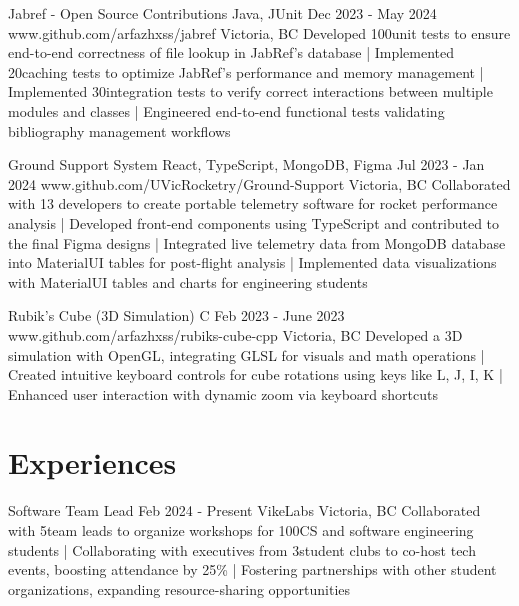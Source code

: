 \documentclass[a4paper,10pt]{article}
\begin{document}

\projectentry
{Jabref - Open Source Contributions}
{Java, JUnit}
{Dec 2023 - May 2024}
{www.github.com/arfazhxss/jabref}
{Victoria, BC}
{Developed 100\plus unit tests to ensure end-to-end correctness of file lookup in JabRef's database
| Implemented 20\plus caching tests to optimize JabRef's performance and memory management
| Implemented 30\plus integration tests to verify correct interactions between multiple modules and classes
| Engineered end-to-end functional tests validating bibliography management workflows
}

\projectentry
{Ground Support System}
{React, TypeScript, MongoDB, Figma}
{Jul 2023 - Jan 2024}
{www.github.com/UVicRocketry/Ground-Support}
{Victoria, BC}
{Collaborated with 13 developers to create portable telemetry software for rocket performance analysis 
| Developed front-end components using TypeScript and contributed to the final Figma designs
| Integrated live telemetry data from MongoDB database into MaterialUI tables for post-flight analysis
| Implemented data visualizations with MaterialUI tables and charts for engineering students 
}

\projectentry
{Rubik's Cube (3D Simulation)}
{C\plusplus}
{Feb 2023 - June 2023}
{www.github.com/arfazhxss/rubiks-cube-cpp}
{Victoria, BC}
{Developed a 3D simulation with OpenGL, integrating GLSL for visuals and math operations 
| Created intuitive keyboard controls for cube rotations using keys like L, J, I, K 
| Enhanced user interaction with dynamic zoom via keyboard shortcuts
}

\section{Experiences}
\relevantexperience
{Software Team Lead}
{Feb 2024 - Present}
{VikeLabs}
{Victoria, BC}
{Collaborated with 5\plus team leads to organize workshops for 100\plus CS and software engineering students 
| Collaborating with executives from 3\plus student clubs to co-host tech events, boosting attendance by 25\% 
| Fostering partnerships with other student organizations, expanding resource-sharing opportunities 
}
\end{document}
